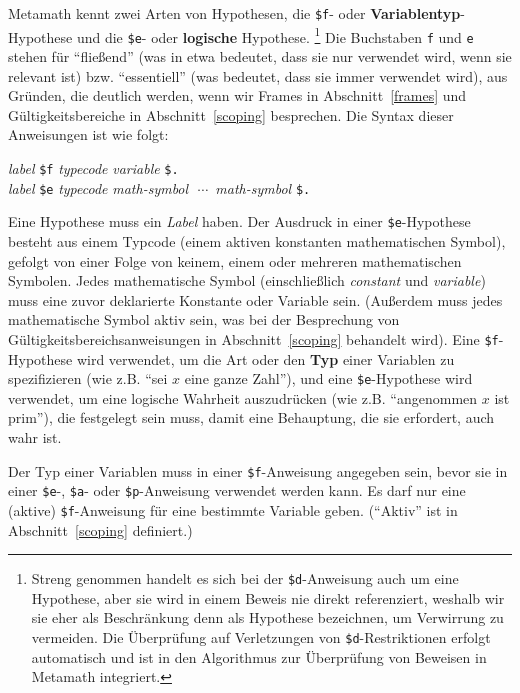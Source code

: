 Metamath kennt zwei Arten von Hypothesen, die \texttt{\$f}- oder {\bf Variablentyp}-Hypothese und die \texttt{\$e}- oder {\bf logische} Hypothese. \footnote{Streng genommen handelt es sich bei der \texttt{\$d}-Anweisung auch um eine Hypothese, aber sie wird in einem Beweis nie direkt referenziert, weshalb wir sie eher als Beschränkung denn als Hypothese bezeichnen, um Verwirrung zu vermeiden.  Die Überprüfung auf Verletzungen von \texttt{\$d}-Restriktionen erfolgt automatisch und ist in den Algorithmus zur Überprüfung von Beweisen in Metamath integriert.} Die Buchstaben \texttt{f} und \texttt{e} stehen für "`fließend"'  (was in etwa bedeutet, dass sie nur verwendet wird, wenn sie relevant ist) bzw. "`essentiell"'  (was bedeutet, dass sie immer verwendet wird), aus Gründen, die deutlich werden, wenn wir Frames in Abschnitt~\ref{frames} und Gültigkeitsbereiche in Abschnitt~\ref{scoping} besprechen. Die Syntax dieser Anweisungen ist wie folgt:
\begin{center}
  {\em label} \texttt{\$f} {\em typecode} {\em variable} \texttt{\$.}\\
  {\em label} \texttt{\$e} {\em typecode}
      {\em math-symbol}\ \,$\cdots$\ {\em math-symbol} \texttt{\$.}\\
\end{center}
Eine Hypothese muss ein {\em Label} haben.  Der Ausdruck in einer \texttt{\$e}-Hypothese besteht aus einem Typcode (einem aktiven konstanten mathematischen Symbol), gefolgt von einer Folge von keinem, einem oder mehreren mathematischen Symbolen. Jedes mathematische Symbol (einschließlich {\em constant} und {\em variable}) muss eine zuvor deklarierte Konstante oder Variable sein.  (Außerdem muss jedes mathematische Symbol aktiv sein, was bei der Besprechung von Gültigkeitsbereichsanweisungen in Abschnitt~\ref{scoping} behandelt wird).  Eine \texttt{\$f}-Hypothese wird verwendet, um die Art oder den {\bf Typ} einer Variablen zu spezifizieren (wie z.B. "`sei $x$ eine ganze Zahl"'), und eine \texttt{\$e}-Hypothese wird verwendet, um eine logische Wahrheit auszudrücken (wie z.B. "`angenommen $x$ ist prim"'), die festgelegt sein muss, damit eine Behauptung, die sie erfordert, auch wahr ist.

Der Typ einer Variablen muss in einer \texttt{\$f}-Anweisung angegeben sein, bevor sie in einer \texttt{\$e}-, \texttt{\$a}- oder \texttt{\$p}-Anweisung verwendet werden kann.  Es darf nur eine (aktive) \texttt{\$f}-Anweisung für eine bestimmte Variable geben.  ("`Aktiv"' ist in Abschnitt~\ref{scoping} definiert.)

